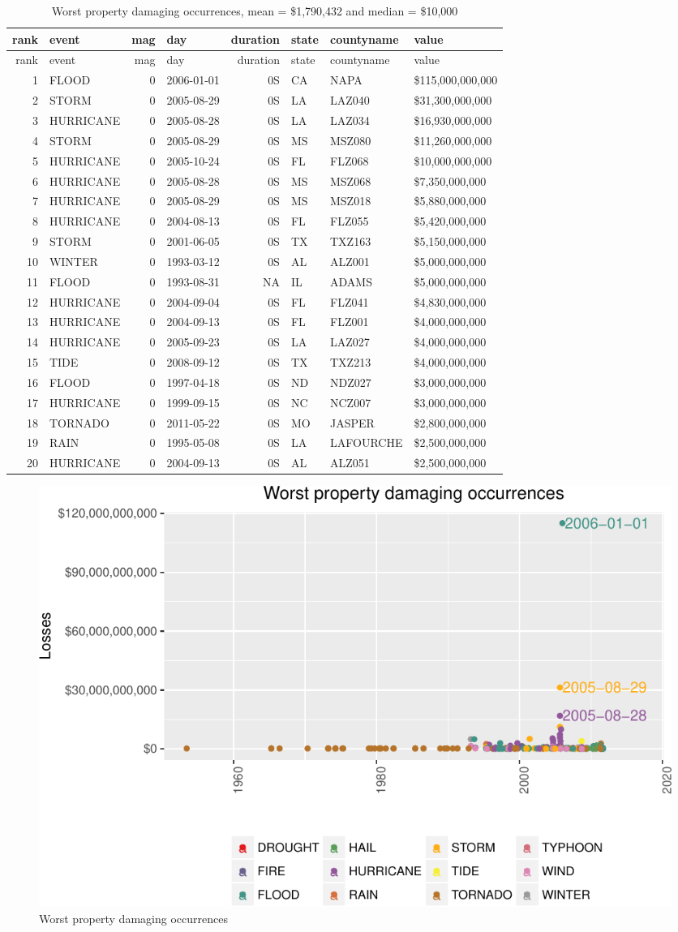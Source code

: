 \begin{longtable}[]{@{}rlrlrlll@{}}
\caption{Worst property damaging occurrences, mean = \$1,790,432 and
median = \$10,000}\tabularnewline
\toprule
rank & event & mag & day & duration & state & countyname &
value\tabularnewline
\midrule
\endfirsthead
\toprule
rank & event & mag & day & duration & state & countyname &
value\tabularnewline
\midrule
\endhead
1 & FLOOD & 0 & 2006-01-01 & 0S & CA & NAPA &
\$115,000,000,000\tabularnewline
2 & STORM & 0 & 2005-08-29 & 0S & LA & LAZ040 &
\$31,300,000,000\tabularnewline
3 & HURRICANE & 0 & 2005-08-28 & 0S & LA & LAZ034 &
\$16,930,000,000\tabularnewline
4 & STORM & 0 & 2005-08-29 & 0S & MS & MSZ080 &
\$11,260,000,000\tabularnewline
5 & HURRICANE & 0 & 2005-10-24 & 0S & FL & FLZ068 &
\$10,000,000,000\tabularnewline
6 & HURRICANE & 0 & 2005-08-28 & 0S & MS & MSZ068 &
\$7,350,000,000\tabularnewline
7 & HURRICANE & 0 & 2005-08-29 & 0S & MS & MSZ018 &
\$5,880,000,000\tabularnewline
8 & HURRICANE & 0 & 2004-08-13 & 0S & FL & FLZ055 &
\$5,420,000,000\tabularnewline
9 & STORM & 0 & 2001-06-05 & 0S & TX & TXZ163 &
\$5,150,000,000\tabularnewline
10 & WINTER & 0 & 1993-03-12 & 0S & AL & ALZ001 &
\$5,000,000,000\tabularnewline
11 & FLOOD & 0 & 1993-08-31 & NA & IL & ADAMS &
\$5,000,000,000\tabularnewline
12 & HURRICANE & 0 & 2004-09-04 & 0S & FL & FLZ041 &
\$4,830,000,000\tabularnewline
13 & HURRICANE & 0 & 2004-09-13 & 0S & FL & FLZ001 &
\$4,000,000,000\tabularnewline
14 & HURRICANE & 0 & 2005-09-23 & 0S & LA & LAZ027 &
\$4,000,000,000\tabularnewline
15 & TIDE & 0 & 2008-09-12 & 0S & TX & TXZ213 &
\$4,000,000,000\tabularnewline
16 & FLOOD & 0 & 1997-04-18 & 0S & ND & NDZ027 &
\$3,000,000,000\tabularnewline
17 & HURRICANE & 0 & 1999-09-15 & 0S & NC & NCZ007 &
\$3,000,000,000\tabularnewline
18 & TORNADO & 0 & 2011-05-22 & 0S & MO & JASPER &
\$2,800,000,000\tabularnewline
19 & RAIN & 0 & 1995-05-08 & 0S & LA & LAFOURCHE &
\$2,500,000,000\tabularnewline
20 & HURRICANE & 0 & 2004-09-13 & 0S & AL & ALZ051 &
\$2,500,000,000\tabularnewline
\bottomrule
\end{longtable}

\suppressfloats\begin{figure}[htbp]
\centering
\includegraphics{readme_files/figure-latex/prop-single-plot-1.pdf}
\caption{Worst property damaging occurrences}
\end{figure}


